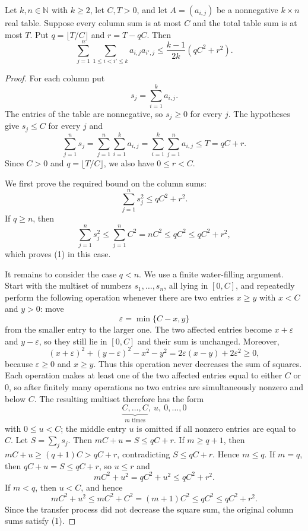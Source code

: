 \begin{lemma}
Let $k,n\in\mathbb N$ with $k\ge2$, let $C,T>0$, and let
$A=(a_{i,j})$ be a nonnegative $k\times n$ real table.  Suppose every column
sum is at most $C$ and the total table sum is at most $T$.  Put
$q=\lfloor T/C\rfloor$ and $r=T-qC$.  Then
\[
\sum_{j=1}^n\sum_{1\le i<i'\le k}a_{i,j}a_{i',j}
\le \frac{k-1}{2k}(qC^2+r^2).
\]
\end{lemma}
\begin{proof}
For each column put
\[
s_j=\sum_{i=1}^k a_{i,j}.
\]
The entries of the table are nonnegative, so $s_j\ge0$ for every $j$.
The hypotheses give $s_j\le C$ for every $j$ and
\[
\sum_{j=1}^n s_j
=\sum_{j=1}^n\sum_{i=1}^k a_{i,j}
=\sum_{i=1}^k\sum_{j=1}^n a_{i,j}
\le T=qC+r .
\]
Since $C>0$ and $q=\lfloor T/C\rfloor$, we also have $0\le r<C$.

We first prove the required bound on the column sums:
\[
\sum_{j=1}^n s_j^2\le qC^2+r^2. \tag{1}
\]
If $q\ge n$, then
\[
\sum_{j=1}^n s_j^2\le \sum_{j=1}^n C^2=nC^2\le qC^2\le qC^2+r^2,
\]
which proves (1) in this case.

It remains to consider the case $q<n$.  We use a finite water-filling
argument.  Start with the multiset of numbers $s_1,\ldots,s_n$, all lying in
$[0,C]$, and repeatedly perform the following operation whenever there are
two entries $x\ge y$ with $x<C$ and $y>0$: move
\[
\varepsilon=\min\{C-x,y\}
\]
from the smaller entry to the larger one.  The two affected entries become
$x+\varepsilon$ and $y-\varepsilon$, so they still lie in $[0,C]$ and their
sum is unchanged.  Moreover,
\[
(x+\varepsilon)^2+(y-\varepsilon)^2-x^2-y^2
=2\varepsilon(x-y)+2\varepsilon^2\ge0,
\]
because $\varepsilon\ge0$ and $x\ge y$.  Thus this operation never decreases
the sum of squares.  Each operation makes at least one of the two affected
entries equal to either $C$ or $0$, so after finitely many operations no two
entries are simultaneously nonzero and below $C$.  The resulting multiset
therefore has the form
\[
\underbrace{C,\ldots,C}_{m\text{ times}},\ u,\ 0,\ldots,0
\]
with $0\le u<C$; the middle entry $u$ is omitted if all nonzero entries are
equal to $C$.  Let $S=\sum_j s_j$.  Then $mC+u=S\le qC+r$.
If $m\ge q+1$, then $mC+u\ge(q+1)C>qC+r$, contradicting $S\le qC+r$.
Hence $m\le q$.  If $m=q$, then $qC+u=S\le qC+r$, so $u\le r$ and
\[
mC^2+u^2=qC^2+u^2\le qC^2+r^2.
\]
If $m<q$, then $u<C$, and hence
\[
mC^2+u^2\le mC^2+C^2=(m+1)C^2\le qC^2\le qC^2+r^2.
\]
Since the transfer process did not decrease the square sum, the original
column sums satisfy (1).


\end{proof}

